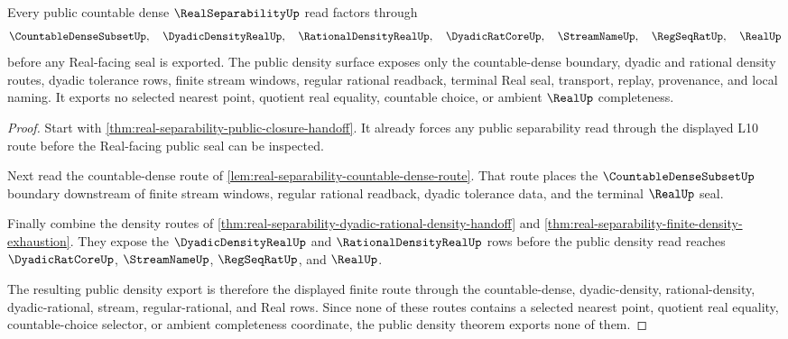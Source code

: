 \begin{theorem}
\label{thm:real-separability-public-density}
Every public countable dense $\RealSeparabilityUp$ read factors through
$$
\CountableDenseSubsetUp,\quad \DyadicDensityRealUp,\quad \RationalDensityRealUp,\quad \DyadicRatCoreUp,\quad \StreamNameUp,\quad \RegSeqRatUp,\quad \RealUp
$$
before any Real-facing seal is exported. The public density surface exposes only the countable-dense boundary, dyadic and rational density routes, dyadic tolerance rows, finite stream windows, regular rational readback, terminal Real seal, transport, replay, provenance, and local naming. It exports no selected nearest point, quotient real equality, countable choice, or ambient $\RealUp$ completeness.
\end{theorem}
\begin{proof}
Start with \autoref{thm:real-separability-public-closure-handoff}. It already forces any public separability read through the displayed L10 route before the Real-facing public seal can be inspected.

Next read the countable-dense route of \autoref{lem:real-separability-countable-dense-route}. That route places the $\CountableDenseSubsetUp$ boundary downstream of finite stream windows, regular rational readback, dyadic tolerance data, and the terminal $\RealUp$ seal.

Finally combine the density routes of \autoref{thm:real-separability-dyadic-rational-density-handoff} and \autoref{thm:real-separability-finite-density-exhaustion}. They expose the $\DyadicDensityRealUp$ and $\RationalDensityRealUp$ rows before the public density read reaches $\DyadicRatCoreUp$, $\StreamNameUp$, $\RegSeqRatUp$, and $\RealUp$.

The resulting public density export is therefore the displayed finite route through the countable-dense, dyadic-density, rational-density, dyadic-rational, stream, regular-rational, and Real rows. Since none of these routes contains a selected nearest point, quotient real equality, countable-choice selector, or ambient completeness coordinate, the public density theorem exports none of them.
\end{proof}
